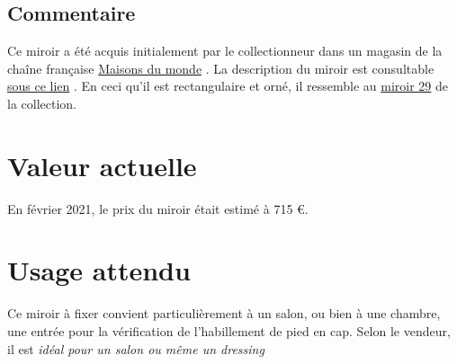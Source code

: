     \subsection* {Commentaire}
     Ce miroir a été acquis initialement par le collectionneur dans un magasin de la
                chaîne française 
    \href{http://www.maisonsdumonde.com/}{Maisons du
                    monde}
  . La description du miroir est consultable 
    \href{http://www.maisonsdumonde.com/FR/fr/p/miroir-trumeau-en-resine-ivoire-70x150-M21017760.htm}{sous ce lien}
  .  En ceci qu’il est rectangulaire et orné, il ressemble au 
    \href{miroir29.xml}{miroir 29}
   de la collection. 
    \section* {Valeur actuelle}
    En février 2021, le prix du miroir était estimé à 715 €.
    \section* {Usage attendu}
     Ce miroir à fixer convient particulièrement à un salon, ou bien à une chambre, une entrée
            pour la vérification de l’habillement de pied en cap. Selon le vendeur, il est 
    {\em {idéal pour un salon ou même un dressing}}
     
  